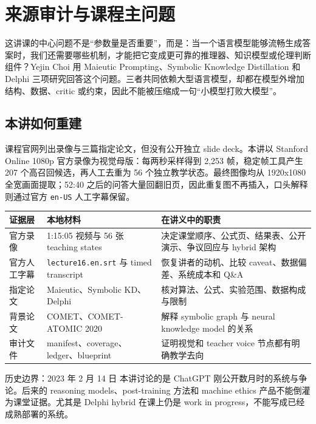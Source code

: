 \section{来源审计与课程主问题}

这讲课的中心问题不是“参数量是否重要”，而是：当一个语言模型能够流畅生成答案时，我们还需要哪些机制，才能把它变成更可靠的推理器、知识模型或伦理判断组件？Yejin Choi 用 Maieutic Prompting、Symbolic Knowledge Distillation 和 Delphi 三项研究回答这个问题。三者共同依赖大型语言模型，却都在模型外增加结构、数据、critic 或约束，因此不能被压缩成一句“小模型打败大模型”。

\subsection{本讲如何重建}

课程官网列出录像与三篇指定论文，但没有公开独立 slide deck。本讲以 Stanford Online 1080p 官方录像为视觉母版：每两秒采样得到 2,253 帧，稳定帧工具产生 207 个高召回候选，再人工去重为 56 个独立教学状态。最终图像均从 1920x1080 全宽画面提取；52:40 之后的问答大量回翻旧页，因此重复图不再插入，口头解释则通过官方 \texttt{en-US} 人工字幕保留。

\begin{longtable}{@{}L{0.18\textwidth}L{0.27\textwidth}L{0.43\textwidth}@{}}
\toprule
证据层 & 本地材料 & 在讲义中的职责 \\
\midrule
官方录像 & 1:15:05 视频与 56 张 teaching states & 决定课堂顺序、公式页、结果表、公开演示、争议回应与 hybrid 架构 \\
官方人工字幕 & \texttt{lecture16.en.srt} 与 timed transcript & 恢复讲者的动机、比较 caveat、数据偏差、系统成本和 Q\&A \\
指定论文 & Maieutic、Symbolic KD、Delphi & 核对算法、公式、实验范围、数据构成与限制 \\
背景论文 & COMET、COMET-ATOMIC 2020 & 解释 symbolic graph 与 neural knowledge model 的关系 \\
审计文件 & manifest、coverage、ledger、blueprint & 证明视觉和 teacher voice 节点都有明确教学去向 \\
\bottomrule
\end{longtable}

\begin{warningbox}{历史边界：2023 年 2 月 14 日}
本讲讨论的是 ChatGPT 刚公开数月时的系统与争论。后来的 reasoning models、post-training 方法和 machine ethics 产品不能倒灌为课堂证据。尤其是 Delphi hybrid 在课上仍是 work in progress，不能写成已经成熟部署的系统。
\end{warningbox}

